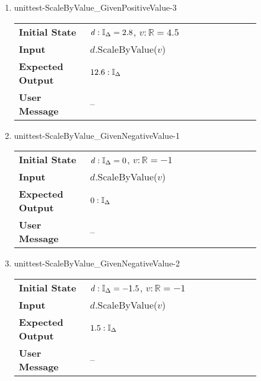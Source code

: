 \begin{enumerate}
    \clearpage

    \item{unittest-ScaleByValue\_GivenPositiveValue-3}
    \begin{table}[H]
        \centering
        \begin{tabular}{P{0.25\linewidth}P{0.6\linewidth}}
            \toprule
            \textbf{Initial State} & $\mathit{d} : \mathbb{I}_{\Delta} = 2.8$,
            $v : \mathbb{R} = 4.5$ \\
            \textbf{Input} & $\mathit{d}$.ScaleByValue($\mathit{v}$) \\
            \midrule
            \textbf{Expected Output} & $12.6 : \mathbb{I}_{\Delta}$ \\
            \textbf{User Message} & -- \\ \bottomrule
        \end{tabular}
    \end{table}

    \item{unittest-ScaleByValue\_GivenNegativeValue-1}
    \begin{table}[H]
        \centering
        \begin{tabular}{P{0.25\linewidth}P{0.6\linewidth}}
            \toprule
            \textbf{Initial State} & $\mathit{d} : \mathbb{I}_{\Delta} = 0$,
            $v : \mathbb{R} = -1$ \\
            \textbf{Input} & $\mathit{d}$.ScaleByValue($\mathit{v}$) \\
            \midrule
            \textbf{Expected Output} & $0 : \mathbb{I}_{\Delta}$ \\
            \textbf{User Message} & -- \\ \bottomrule
        \end{tabular}
    \end{table}

    \item{unittest-ScaleByValue\_GivenNegativeValue-2}
    \begin{table}[H]
        \centering
        \begin{tabular}{P{0.25\linewidth}P{0.6\linewidth}}
            \toprule
            \textbf{Initial State} & $\mathit{d} : \mathbb{I}_{\Delta} = -1.5$,
            $v : \mathbb{R} = -1$ \\
            \textbf{Input} & $\mathit{d}$.ScaleByValue($\mathit{v}$) \\
            \midrule
            \textbf{Expected Output} & $1.5 : \mathbb{I}_{\Delta}$ \\
            \textbf{User Message} & -- \\ \bottomrule
        \end{tabular}
    \end{table}


\end{enumerate}
